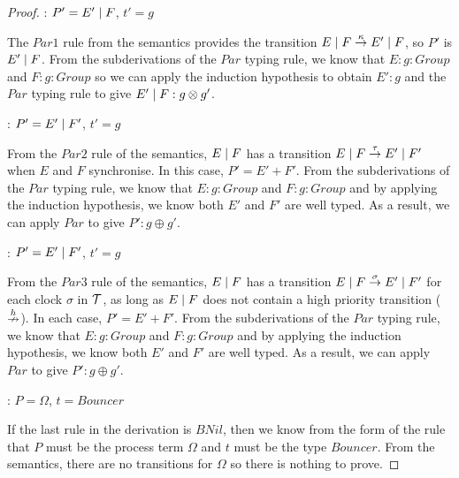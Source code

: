 \begin{proof}
: $P' = E' \;|\; F$, $t' = g$

\noindent The $Par1$ rule from the semantics provides the transition
$E \;|\; F \stackrel{\kappa}{\rightarrow} E' \;|\; F$, so $P'$ is $E' \;|\; F$.  From the
subderivations of the $Par$ typing rule, we know that $E : g : Group$
and $F : g : Group$ so we can apply the induction hypothesis to obtain
$E' : g$ and the $Par$ typing rule to give $E' \;|\; F : g \otimes g'$.

: $P' = E' \;|\; F'$, $t' = g$

\noindent From the $Par2$ rule of the semantics, $E \;|\; F$ has a
transition $E \;|\; F \stackrel{\tau}{\rightarrow} E' \;|\; F'$ when $E$ and $F$
synchronise.  In this case, $P' = E' + F'$.  From the subderivations
of the $Par$ typing rule, we know that $E : g : Group$ and $F : g :
Group$ and by applying the induction hypothesis, we know both $E'$ and
$F'$ are well typed.  As a result, we can apply $Par$ to give $P' : g
\oplus g'$.

: $P' = E' \;|\; F'$, $t' = g$

\noindent From the $Par3$ rule of the semantics, $E \;|\; F$ has a
transition $E \;|\; F \stackrel{\sigma}{\rightarrow} E' \;|\; F'$ for each clock
$\sigma$ in $\text{$\mathcal{T}$}$, as long as $E \;|\; F$ does not contain a high
priority transition ($\stackrel{h}{\nrightarrow}$).  In each case, $P' = E' + F'$.
From the subderivations of the $Par$ typing rule, we know that $E : g
: Group$ and $F : g : Group$ and by applying the induction hypothesis,
we know both $E'$ and $F'$ are well typed.  As a result, we can apply
$Par$ to give $P' : g \oplus g'$.

: $P = \Omega$, $t = Bouncer$

\noindent If the last rule in the derivation is $BNil$, then we know
from the form of the rule that $P$ must be the process term $\Omega$
and $t$ must be the type $Bouncer$.  From the semantics, there are no
transitions for $\Omega$ so there is nothing to prove.

\end{proof}

